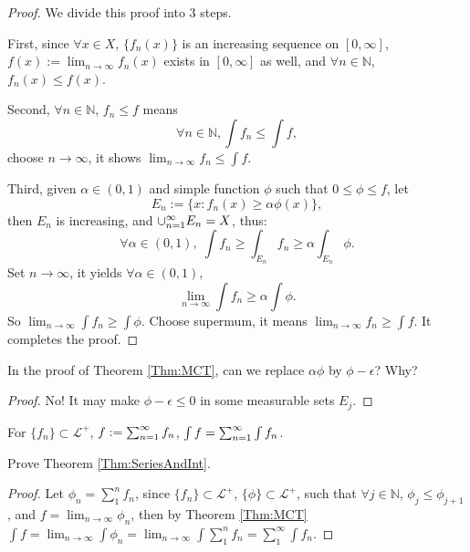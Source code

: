 \begin{proof}
    We divide this proof into 3 steps. 

    First, since $\forall x\in X$, $\{f_{n}(x)\}$ is an increasing 
    sequence on $[0,\infty]$, $f(x):=\lim_{n\rightarrow\infty}f_{n}(x)$ 
    exists in $[0,\infty]$ as well, and $\forall n\in\mathbb{N}$, 
    $f_{n}(x)\le f(x)$.

    Second, $\forall n\in\mathbb{N}$, $f_{n}\le f$ means 
    \begin{displaymath}
        \forall n\in\mathbb{N}, \int f_{n}\le\int f,
    \end{displaymath}
    choose $n\rightarrow\infty$, 
    it shows $\lim_{n\rightarrow\infty}f_{n}\le\int f$.

    Third, given $\alpha\in(0,1)$ and simple function $\phi$ 
    such that $0\le\phi\le f$, let 
    \begin{displaymath}
        E_n:=\{x:f_{n}(x)\ge\alpha\phi(x)\},
    \end{displaymath}
    then $E_{n}$ is increasing, and $\cup_{n=1}^{\infty}E_n=X$, thus:
    \begin{displaymath}
        \forall\alpha\in(0,1),\;
        \int f_n\ge\int_{E_n}f_{n}\ge\alpha\int_{E_n}\phi.
    \end{displaymath}
    Set $n\rightarrow\infty$, it yields $\forall\alpha\in(0,1)$, 
    \begin{displaymath}
        \lim_{n\rightarrow\infty}\int f_n\ge\alpha\int\phi.
    \end{displaymath}
    So $\lim_{n\rightarrow\infty}\int f_n\ge\int\phi$. 
    Choose supermum, it means 
    $\lim_{n\rightarrow\infty}f_n\ge\int f$. 
    It completes the proof.
\end{proof}
\begin{exc}
    In the proof of Theorem \ref{Thm:MCT}, 
    can we replace $\alpha\phi$ by $\phi-\epsilon$? 
    Why?
\end{exc}
\begin{proof}
    No! It may make $\phi-\epsilon\leq0$ in some measurable
    sets $E_j$.
\end{proof}
\begin{thm}
    \label{Thm:SeriesAndInt}
    For $\{f_n\}\subset \mathcal{L}^{+}$, 
    $f:=\sum_{n=1}^{\infty}f_n$, 
    $\int f=\sum_{n=1}^{\infty}\int f_n$.
\end{thm}
\begin{exc}
    Prove Theorem \ref{Thm:SeriesAndInt}.
\end{exc}
\begin{proof}
    Let $\phi_n=\sum_{1}^{n}f_n$, since 
    $\{f_n\}\subset\mathcal{L}^{+}$, 
    $\{\phi\}\subset\mathcal{L}^{+}$, such that 
    $\forall j\in\mathbb{N}$, $\phi_j\leq\phi_{j+1}$, and
    $f=\lim_{n\rightarrow\infty}\phi_n$,
    then by Theorem \ref{Thm:MCT} $\int f=\lim_{n\rightarrow\infty}\int\phi_n
    =\lim_{n\rightarrow\infty}\int\sum_{1}^{n}f_n
    =\sum_{1}^{\infty}\int f_n$.
\end{proof}
